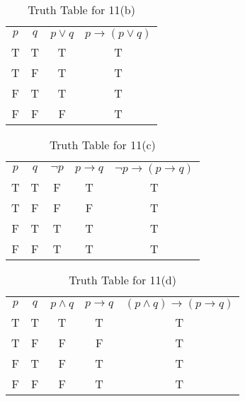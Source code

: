 \documentclass{Axon}
\begin{document}
\begin{table}[ht]
    \centering
    \begin{tabular}{c|c|c|c}
        \(p\) & \(q\) & \(p \lor q\) & \(p \to (p \lor q)\) \\
        T     & T     & T            & T                     \\
        T     & F     & T            & T                    \\
        F     & T     & T            & T                    \\
        F     & F     & F            & T
    \end{tabular}
    \caption{Truth Table for 11(b)}
\end{table}

\begin{table}[ht]
    \centering
    \begin{tabular}{c|c|c|c|c}
        \(p\) & \(q\) & \(\lnot p\) & \(p \to q\) & \(\lnot p \to (p \to q)\) \\
        T     & T     & F           & T           & T                         \\
        T     & F     & F           & F           & T                         \\
        F     & T     & T           & T           & T                         \\
        F     & F     & T           & T           & T
    \end{tabular}
    \caption{Truth Table for 11(c)}
\end{table}

\begin{table}[ht]
    \centering
    \begin{tabular}{c|c|c|c|c}
        \(p\) & \(q\) & \(p \land q\) & \(p \to q\) & \((p \land q) \to (p \to q)\) \\
        T     & T     & T             & T           & T                             \\
        T     & F     & F             & F           & T                             \\
        F     & T     & F             & T           & T                             \\
        F     & F     & F             & T           & T
    \end{tabular}
    \caption{Truth Table for 11(d)}
\end{table}
\end{document}
